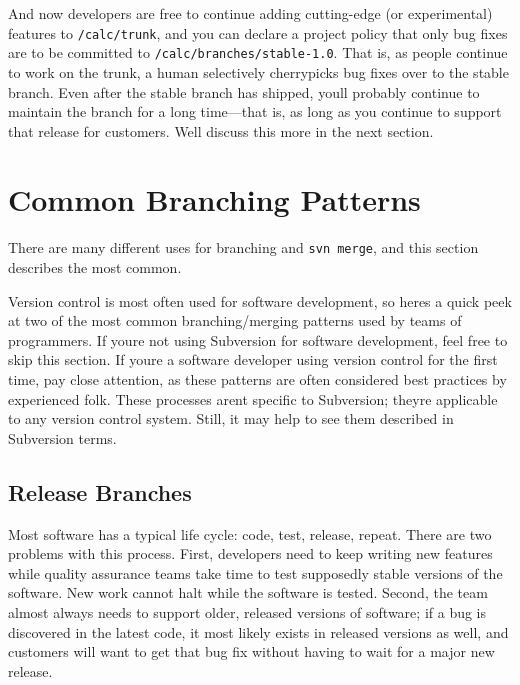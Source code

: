 And now developers are free to continue adding cutting-edge (or
experimental) features to \texttt{/calc/trunk}, and you can declare a
project policy that only bug fixes are to be committed to
\texttt{/calc/branches/stable-1.0}. That is, as people continue to work
on the trunk, a human selectively cherrypicks bug fixes over to the
stable branch. Even after the stable branch has shipped,
you\textquotesingle ll probably continue to maintain the branch for a
long time---that is, as long as you continue to support that release for
customers. We\textquotesingle ll discuss this more in the next section.

\section{Common Branching
Patterns}\label{svn.branchmerge.commonpatterns}

There are many different uses for branching and \texttt{svn\ merge}, and
this section describes the most common.

Version control is most often used for software development, so
here\textquotesingle s a quick peek at two of the most common
branching/merging patterns used by teams of programmers. If
you\textquotesingle re not using Subversion for software development,
feel free to skip this section. If you\textquotesingle re a software
developer using version control for the first time, pay close attention,
as these patterns are often considered best practices by experienced
folk. These processes aren\textquotesingle t specific to Subversion;
they\textquotesingle re applicable to any version control system. Still,
it may help to see them described in Subversion terms.

\subsection{Release
Branches}\label{svn.branchmerge.commonpatterns.release}

Most software has a typical life cycle: code, test, release, repeat.
There are two problems with this process. First, developers need to keep
writing new features while quality assurance teams take time to test
supposedly stable versions of the software. New work cannot halt while
the software is tested. Second, the team almost always needs to support
older, released versions of software; if a bug is discovered in the
latest code, it most likely exists in released versions as well, and
customers will want to get that bug fix without having to wait for a
major new release.

